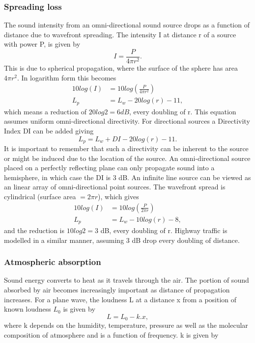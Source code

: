 \subsubsection{Spreading loss} 
The sound intensity from an omni-directional sound source drops as a function of distance due to wavefront spreading. The intensity I at distance r of a source with power P, is given by
\begin{equation}
    I = \frac{P}{4\pi r^2}.
\end{equation}
This is due to spherical propagation, where the surface of the sphere has area $4\pi r^2$. In logarithm form this becomes
\begin{equation}
\begin{split}
    10log(I) &= 10log(\frac{P}{4\pi r^2}) \\
    L_p &= L_w - 20 log(r) - 11,
\end{split}
\end{equation}
which means a reduction of $20log2 = 6 dB$, every doubling of r. This equation assumes uniform omni-directional directivity. For directional sources a Directivity Index DI can be added giving
\begin{equation}
    L_p = L_w + DI - 20 log(r) - 11.
\end{equation}
It is important to remember that such a directivity can be inherent to the source or might be induced due to the location of the source. An omni-directional source placed on a perfectly reflecting plane can only propagate sound into a hemisphere, in which case the DI is 3 dB.  
An infinite line source can be viewed as an linear array of omni-directional point sources. The wavefront spread is cylindrical (surface area $= 2\pi r$),  which gives 
\begin{equation}
\begin{split}
    10log(I) &= 10log(\frac{P}{2\pi r}) \\
    L_p &= L_w - 10 log(r) - 8,
\end{split}
\end{equation}
and the reduction is $10log2 = 3$ dB, every doubling of r. Highway traffic is modelled in a similar manner, assuming 3 dB drop every doubling of distance.

\subsubsection{Atmospheric absorption}
Sound energy converts to heat as it travels through the air. The portion of sound absorbed by air becomes increasingly important as distance of propagation increases. For a plane wave, the loudness L at a distance x from a position of known loudness $L_0$ is given by
\begin{equation}
    L= L_0 - k.x,
\end{equation}
where k depends on the humidity, temperature, pressure as well as the molecular composition of atmosphere and is a function of frequency. k is given by
\begin{equation}

\end{equation}


